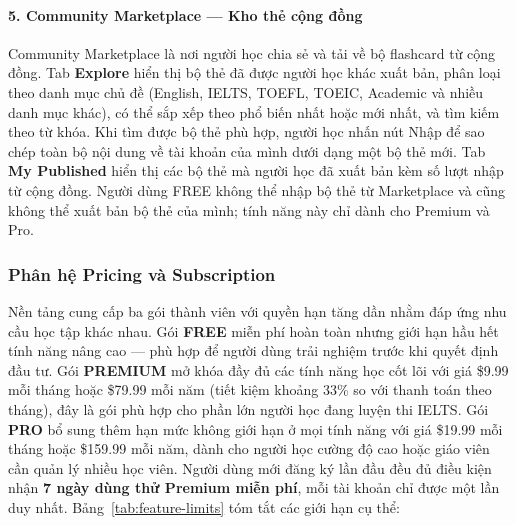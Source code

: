 \paragraph{5. Community Marketplace --- Kho thẻ cộng đồng}

Community Marketplace là nơi người học chia sẻ và tải về bộ flashcard từ cộng đồng. Tab \textbf{Explore} hiển thị bộ thẻ đã được người học khác xuất bản, phân loại theo danh mục chủ đề (English, IELTS, TOEFL, TOEIC, Academic và nhiều danh mục khác), có thể sắp xếp theo phổ biến nhất hoặc mới nhất, và tìm kiếm theo từ khóa. Khi tìm được bộ thẻ phù hợp, người học nhấn nút Nhập để sao chép toàn bộ nội dung về tài khoản của mình dưới dạng một bộ thẻ mới. Tab \textbf{My Published} hiển thị các bộ thẻ mà người học đã xuất bản kèm số lượt nhập từ cộng đồng. Người dùng FREE không thể nhập bộ thẻ từ Marketplace và cũng không thể xuất bản bộ thẻ của mình; tính năng này chỉ dành cho Premium và Pro.

\subsubsection{Phân hệ Pricing và Subscription}

Nền tảng cung cấp ba gói thành viên với quyền hạn tăng dần nhằm đáp ứng nhu cầu học tập khác nhau. Gói \textbf{FREE} miễn phí hoàn toàn nhưng giới hạn hầu hết tính năng nâng cao --- phù hợp để người dùng trải nghiệm trước khi quyết định đầu tư. Gói \textbf{PREMIUM} mở khóa đầy đủ các tính năng học cốt lõi với giá \$9.99 mỗi tháng hoặc \$79.99 mỗi năm (tiết kiệm khoảng 33\% so với thanh toán theo tháng), đây là gói phù hợp cho phần lớn người học đang luyện thi IELTS. Gói \textbf{PRO} bổ sung thêm hạn mức không giới hạn ở mọi tính năng với giá \$19.99 mỗi tháng hoặc \$159.99 mỗi năm, dành cho người học cường độ cao hoặc giáo viên cần quản lý nhiều học viên. Người dùng mới đăng ký lần đầu đều đủ điều kiện nhận \textbf{7 ngày dùng thử Premium miễn phí}, mỗi tài khoản chỉ được một lần duy nhất. Bảng~\ref{tab:feature-limits} tóm tắt các giới hạn cụ thể:

